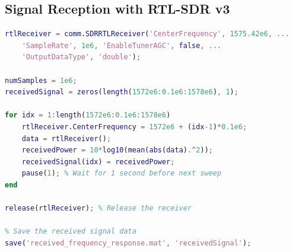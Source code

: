 \documentclass[12pt,letter]{article}
\begin{document}
\subsection*{Signal Reception with RTL-SDR v3}
\begin{lstlisting}[language=Matlab, caption={MATLAB Script for Signal Reception using RTL-SDR v3}, label={lst:signal_reception}]
% MATLAB Script for Signal Reception using RTL-SDR v3
rtlReceiver = comm.SDRRTLReceiver('CenterFrequency', 1575.42e6, ...
    'SampleRate', 1e6, 'EnableTunerAGC', false, ...
    'OutputDataType', 'double');

numSamples = 1e6;
receivedSignal = zeros(length(1572e6:0.1e6:1578e6), 1);

for idx = 1:length(1572e6:0.1e6:1578e6)
    rtlReceiver.CenterFrequency = 1572e6 + (idx-1)*0.1e6;
    data = rtlReceiver();
    receivedPower = 10*log10(mean(abs(data).^2));
    receivedSignal(idx) = receivedPower;
    pause(1); % Wait for 1 second before next sweep
end

release(rtlReceiver); % Release the receiver

% Save the received signal data
save('received_frequency_response.mat', 'receivedSignal');
\end{lstlisting}
\end{document}
